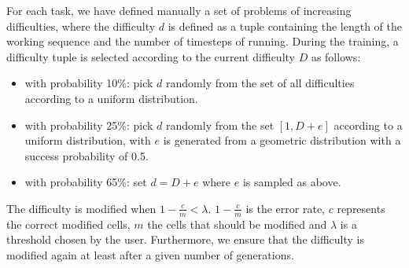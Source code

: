 For each task, we have defined manually a set of problems of increasing difficulties, where the difficulty $d$ is defined as a tuple containing the length of the working sequence and the number of timesteps of running. During the training, a difficulty tuple is selected according to the current difficulty $D$ as follows:
\begin{itemize}
	\item{with probability 10\%: pick $d$ randomly from the set of all difficulties according to a uniform distribution.}
	\item{with probability 25\%: pick $d$ randomly from the set $[1, D + e]$ according to a uniform distribution, with $e$ is generated from a geometric distribution with a success probability of 0.5.}
	\item{with probability 65\%: set $d = D + e$ where $e$ is sampled as above.}
\end{itemize}
The difficulty is modified when $1 - \frac{c}{m} < \lambda$. $1 - \frac{c}{m}$ is the error rate, $c$ represents the correct modified cells, $m$ the cells that should be modified and $\lambda$ is a threshold chosen by the user. Furthermore, we ensure that the difficulty is modified again at least after a given number of generations.



